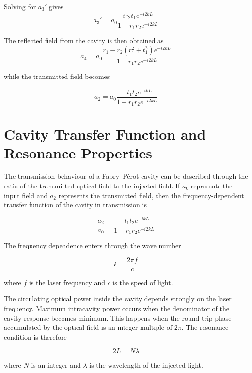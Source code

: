 \documentclass{report}
\begin{document}
Solving for $a_3'$ gives
\begin{equation}
a_3'
=
a_0
\frac{
i r_2 t_1 e^{-i2kL}
}{
1-r_1 r_2 e^{-i2kL}
}
\end{equation}

The reflected field from the cavity is then obtained as
\begin{equation}
    \boxed{a_4=a_0\frac{r_1-r_2(r_1^2+t_1^2)e^{-i2kL}}{1-r_1 r_2 e^{-i2kL}}}
\end{equation}

while the transmitted field becomes

\begin{equation}
\boxed{a_2=a_0\frac{-t_1 t_2 e^{-ikL}}{1-r_1 r_2 e^{-i2kL}}}
\end{equation}

\section{Cavity Transfer Function and Resonance Properties}

The transmission behaviour of a Fabry--P\'erot cavity can be described through the ratio of the transmitted optical field to the injected field. If $a_0$ represents the input field and $a_2$ represents the transmitted field, then the frequency-dependent transfer function of the cavity in transmission is

\begin{equation}
\frac{a_2}{a_0}
=
\frac{
-t_1 t_2 e^{-ikL}
}{
1-r_1 r_2 e^{-i2kL}
}
\end{equation}

The frequency dependence enters through the wave number

\begin{equation}
k=\frac{2\pi f}{c}
\end{equation}

where $f$ is the laser frequency and $c$ is the speed of light.

The circulating optical power inside the cavity depends strongly on the laser frequency. Maximum intracavity power occurs when the denominator of the cavity response becomes minimum. This happens when the round-trip phase accumulated by the optical field is an integer multiple of $2\pi$. The resonance condition is therefore

\begin{equation}
2L = N\lambda
\end{equation}

where $N$ is an integer and $\lambda$ is the wavelength of the injected light.
\end{document}
